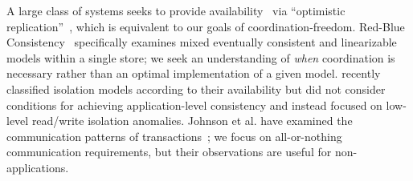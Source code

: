 A large class of systems
seeks to provide availability~\cite{gilbert-cap} via ``optimistic
replication''~\cite{optimistic}, which is equivalent to our goals of
coordination-freedom. Red-Blue Consistency~\cite{redblue} specifically
examines mixed eventually consistent and linearizable models within a
single store; we seek an understanding of \textit{when} coordination
is necessary rather than an optimal implementation of a given
model. \cite{hat-vldb} recently classified isolation models according
to their availability but did not consider conditions for achieving
application-level consistency and instead focused on low-level
read/write isolation anomalies.  Johnson et al. have examined the
communication patterns of transactions~\cite{shore-communication}; we
focus on all-or-nothing communication requirements, but their
observations are useful for non-\iconfluent applications.


